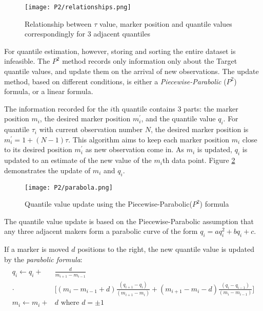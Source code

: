 \begin{figure}[h]
    \centering
	\texttt{[image: P2/relationships.png]}
    \caption{Relationship between $\tau$ value, marker position and quantile values correspondingly for 3 adjacent quantiles}
    \label{fig: {multi_relationship_p2}}
\end{figure}

For quantile estimation, however, storing and sorting the entire dataset is infeasible. The $P^2$ method records only information only about the Target quantile values, and update them on the arrival of new observations. The update method, based on different conditions, is either a \textit{Piecewise-Parabolic} ($P^2$) formula, or a linear formula.

The information recorded for the $i$th quantile contains 3 parts: the marker position $m_i$, the desired marker position $m_i^\prime$, and the quantile value $q_i$. For quantile $\tau_i$ with current observation number $N$, the desired marker position is $m_i^\prime = 1 + (N-1)\tau$. This algorithm aims to keep each marker position $m_i$ close to its desired position $m_i^\prime$ as new observation come in. As $m_i$ is updated, $q_i$ is updated to an estimate of the new value of the $m_i$th data point.
Figure \ref{fig: {multi_parabolic_p2}} demonstrates the update of $m_i$ and $q_i$.

\begin{figure}[h]
    \centering
	\texttt{[image: P2/parabola.png]}
    \caption{Quantile value update using the Piecewise-Parabolic($P^2$) formula}
    \label{fig: {multi_parabolic_p2}}
\end{figure}

The quantile value update is based on the Piecewise-Parabolic assumption that any three adjacent makers form a parabolic curve of the form $q_i = aq_i^2 + bq_i + c$.

If a marker is moved $d$ positions to the right, the new quantile value is updated by the \textit{parabolic formula}:
\begin{align}
\begin{split}
    q_{i} \leftarrow q_{i}+ & \frac{d}{m_{i+1}-m_{i-1}}\\
    \cdot & { \bigg[ 
        \left(m_{i}-m_{i-1}+d\right) \frac{\left(q_{i+1}-q_{i}\right)}{\left(m_{i+1}-m_{i}\right)}
        +\left(m_{i+1}-m_{i}-d\right) \frac{\left(q_{i}-q_{i-1}\right)}{\left(m_{i}-m_{i-1}\right)}
        } \bigg] \\
    m_{i} \leftarrow m_{i}+&d \text{ where } d = \pm 1
\end{split}
\end{align}

